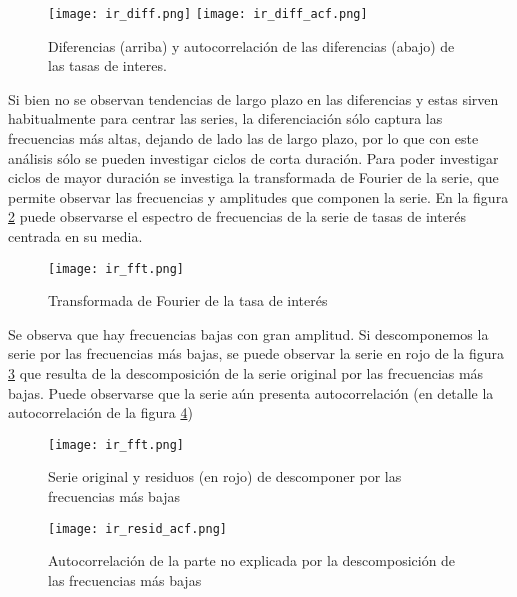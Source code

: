 \documentclass[a4paper]{article}
\begin{document}
\begin{figure}[H]
	\centering
	\texttt{[image: ir\_diff.png]}
	\texttt{[image: ir\_diff\_acf.png]}
	\caption{Diferencias (arriba) y autocorrelación de las diferencias (abajo) de las tasas de interes.} 	
	\label{fig:ir_diff_acf}
\end{figure}

Si bien no se observan tendencias de largo plazo en las diferencias y estas sirven habitualmente para centrar las series, la diferenciación sólo captura las frecuencias más altas, dejando de lado las de largo plazo, por lo que con este análisis sólo se pueden investigar ciclos de corta duración. Para poder investigar ciclos de mayor duración se investiga la transformada de Fourier de la serie, que permite observar las frecuencias y amplitudes que componen la serie. En la figura \ref{fig:ir_fft} puede observarse el espectro de frecuencias de la serie de tasas de interés centrada en su media.

\begin{figure}[H]
	\centering
	\texttt{[image: ir\_fft.png]}
	\caption{Transformada de Fourier de la tasa de interés} 	
	\label{fig:ir_fft}
\end{figure}

Se observa que hay frecuencias bajas con gran amplitud. Si descomponemos la serie por las frecuencias más bajas, se puede observar la serie en rojo de la figura \ref{fig:ir_orig_resid} que resulta de la descomposición de la serie original por las frecuencias más bajas. Puede observarse que la serie aún presenta autocorrelación (en detalle la autocorrelación de la figura \ref{fig:ir_resid_acf})

\begin{figure}[H]
	\centering
	\texttt{[image: ir\_fft.png]}
	\caption{Serie original y residuos (en rojo) de descomponer por las frecuencias más bajas} 	
	\label{fig:ir_orig_resid}
\end{figure}

\begin{figure}[H]
	\centering
	\texttt{[image: ir\_resid\_acf.png]}
	\caption{Autocorrelación de la parte no explicada por la descomposición de las frecuencias más bajas} 	
	\label{fig:ir_resid_acf}
\end{figure}
\end{document}
